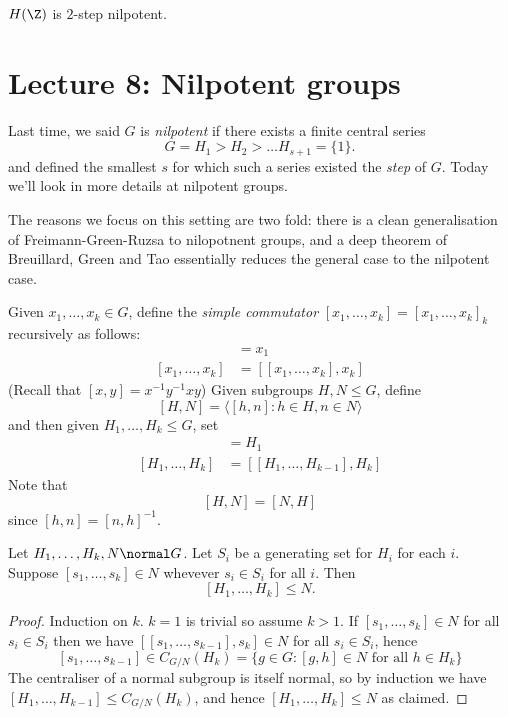 \documentclass[a4paper]{article}
\begin{document}
\begin{ex}
  \(H(\Z)\) is \(2\)-step nilpotent.
\end{ex}

\section*{Lecture 8: Nilpotent groups}

Last time, we said \(G\) is \emph{nilpotent} if there exists a finite central series
\[
  G = H_1 > H_2 > \dots H_{s + 1} = \{1\}.
\]
and defined the smallest \(s\) for which such a series existed the \emph{step} of \(G\). Today we'll look in more details at nilpotent groups.

The reasons we focus on this setting are two fold: there is a clean generalisation of Freimann-Green-Ruzsa to nilopotnent groups, and a deep theorem of Breuillard, Green and Tao essentially reduces the general case to the nilpotent case.

Given \(x_1, \dots, x_k \in G\), define the \emph{simple commutator} \([x_1, \dots, x_k] = [x_1, \dots, x_k]_k\) recursively as follows:
\begin{align*}
  [x_1] &= x_1 \\
  [x_1, \dots, x_k] &= [[x_1, \dots, x_k], x_k]
\end{align*}
(Recall that \([x, y] = x^{-1}y^{-1}xy\)) Given subgroups \(H, N \leq G\), define
\[
  [H, N] = \langle [h, n]: h \in H, n \in N \rangle
\]
and then given \(H_1, \dots, H_k \leq G\), set
\begin{align*}
  [H_1] &= H_1 \\
  [H_1, \dots, H_k] &= [[H_1, \dots, H_{k - 1}], H_k]
\end{align*}
Note that
\[
  [H, N] = [N, H]
  \tag{8.1}
\]
since \([h, n] = [n, h]^{-1}\).

\begin{lemma}[lemma 8.1]
  Let \(H_1, \dots, H_k, N \normal G\). Let \(S_i\) be a generating set for \(H_i\) for each \(i\). Suppose \([s_1, \dots, s_k] \in N\) whevever \(s_i \in S_i\) for all \(i\). Then
  \[
    [H_1, \dots, H_k] \leq N.
  \]
\end{lemma}

\begin{proof}
  Induction on \(k\). \(k = 1\) is trivial so assume \(k > 1\). If \([s_1, \dots, s_k] \in N\) for all \(s_i \in S_i\) then we have \([[s_1, \dots, s_{k - 1}], s_k] \in N\) for all \(s_i \in S_i\), hence
  \[
    [s_1, \dots, s_{k - 1}] \in C_{G/N} (H_k) = \{g \in G: [g, h] \in N \text{ for all } h \in H_k\}
  \]
  The centraliser of a normal subgroup is itself normal, so by induction we have \([H_1, \dots, H_{k - 1}] \leq C_{G/N}(H_k)\), and hence \([H_1, \dots, H_k] \leq N\) as claimed.
\end{proof}
\end{document}
